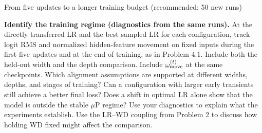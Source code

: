 \begin{problem}{From five updates to a longer training budget (recommended: 50 new runs)}
\begin{parts}
\item \textbf{Identify the training regime (diagnostics from the same runs).}
At the directly transferred LR and the best sampled LR for each configuration,
track logit RMS and normalized hidden-feature movement on fixed inputs during
the first five updates and at the end of training, as in Problem 4.1. Include both the held-out width and the depth comparison.
Include $\omega_{\rm move}^{(t)}$ at the same
checkpoints. Which alignment assumptions are supported at different widths,
depths, and stages of training?
Can a configuration with larger early transients still achieve a better final loss?
Does a shift in optimal LR alone show that the model is outside the stable
$\mu$P regime? Use your diagnostics to explain what the experiments establish.
Use the LR--WD coupling from Problem 2 to discuss how holding WD fixed might
affect the comparison.

\end{parts}
\end{problem}
